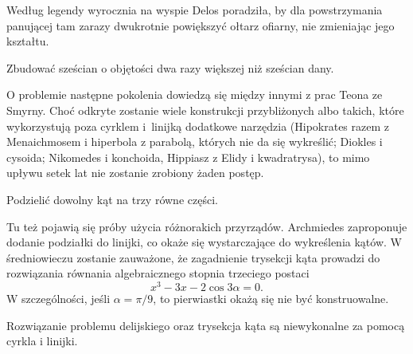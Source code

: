 Według legendy wyrocznia na wyspie Delos poradziła, by dla powstrzymania panującej tam zarazy dwukrotnie powiększyć ołtarz ofiarny, nie zmieniając jego kształtu.

\begin{problem}
    Zbudować sześcian o objętości dwa razy większej niż sześcian dany.
\end{problem}

O problemie następne pokolenia dowiedzą się między innymi z prac Teona ze Smyrny.
%
Choć odkryte zostanie wiele konstrukcji przybliżonych albo takich, które wykorzystują poza cyrklem i~linijką dodatkowe narzędzia (Hipokrates razem z Menaichmosem i hiperbola z parabolą, których nie da się wykreślić; Diokles i cysoida; Nikomedes i konchoida, Hippiasz z Elidy i kwadratrysa), to mimo upływu setek lat nie zostanie zrobiony żaden postęp.
%
%
%
%
%
%
%
%
%
%

\begin{problem}
    Podzielić dowolny kąt na trzy równe części.
\end{problem}

Tu też pojawią się próby użycia różnorakich przyrządów.
Archmiedes zaproponuje dodanie podziałki do linijki, co okaże się wystarczające do wykreślenia kątów.
W średniowieczu zostanie zauważone, że zagadnienie trysekcji kąta prowadzi do rozwiązania równania algebraicznego stopnia trzeciego postaci
\begin{equation}
    x^3 - 3 x - 2 \cos 3\alpha = 0.
\end{equation}
W szczególności, jeśli $\alpha = \pi / 9$, to pierwiastki okażą się nie być konstruowalne.

\begin{proposition}
    Rozwiązanie problemu delijskiego oraz trysekcja kąta są niewykonalne za pomocą cyrkla i linijki.
\end{proposition}

